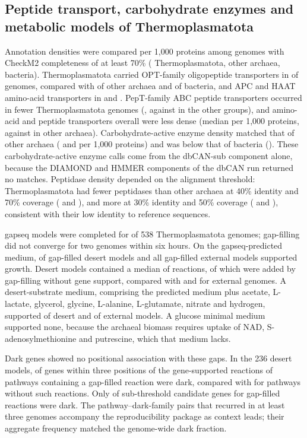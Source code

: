 \subsection*{Peptide transport, carbohydrate enzymes and metabolic models of Thermoplasmatota}
Annotation densities were compared per 1,000 proteins among genomes with CheckM2 completeness of at least 70\% ( Thermoplasmatota,  other archaea,  bacteria). Thermoplasmatota carried OPT-family oligopeptide transporters in  of genomes, compared with  of other archaea and  of bacteria, and APC and HAAT amino-acid transporters in  and . PepT-family ABC peptide transporters occurred in fewer Thermoplasmatota genomes (, against  in the other groups), and amino-acid and peptide transporters overall were less dense (median  per 1,000 proteins, against  in other archaea). Carbohydrate-active enzyme density matched that of other archaea ( and  per 1,000 proteins) and was below that of bacteria (). These carbohydrate-active enzyme calls come from the dbCAN-sub component alone, because the DIAMOND and HMMER components of the dbCAN run returned no matches. Peptidase density depended on the alignment threshold: Thermoplasmatota had fewer peptidases than other archaea at 40\% identity and 70\% coverage ( and ), and more at 30\% identity and 50\% coverage ( and ), consistent with their low identity to reference sequences.

gapseq models were completed for  of 538 Thermoplasmatota genomes; gap-filling did not converge for two genomes within six hours. On the gapseq-predicted medium,  of  gap-filled desert models and all  gap-filled external models supported growth. Desert models contained a median of  reactions, of which  were added by gap-filling without gene support, compared with  and  for external genomes. A desert-substrate medium, comprising the predicted medium plus acetate, L-lactate, glycerol, glycine, L-alanine, L-glutamate, nitrate and hydrogen, supported  of  desert and  of  external models. A glucose minimal medium supported none, because the archaeal biomass requires uptake of NAD, S-adenosylmethionine and putrescine, which that medium lacks.

Dark genes showed no positional association with these gaps. In the 236 desert models,  of genes within three positions of the gene-supported reactions of pathways containing a gap-filled reaction were dark, compared with  for pathways without such reactions. Only  of  sub-threshold candidate genes for gap-filled reactions were dark. The  pathway--dark-family pairs that recurred in at least three genomes accompany the reproducibility package as context leads; their aggregate frequency matched the genome-wide dark fraction.

